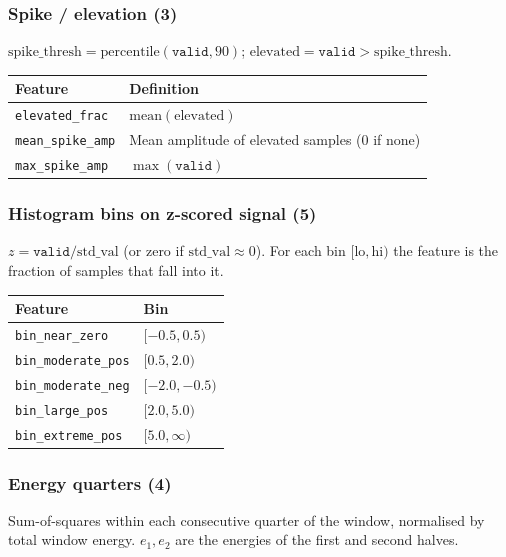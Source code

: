 \documentclass[11pt,a4paper]{article}
\begin{document}
\subsubsection*{Spike / elevation (3)}

$\mathrm{spike\_thresh} = \mathrm{percentile}(\texttt{valid}, 90)$;
$\mathrm{elevated} = \texttt{valid} > \mathrm{spike\_thresh}$.

\begin{tabular}{@{}lp{10cm}@{}}
\toprule
\textbf{Feature} & \textbf{Definition} \\
\midrule
\texttt{elevated\_frac}  & $\mathrm{mean}(\mathrm{elevated})$ \\
\texttt{mean\_spike\_amp}& Mean amplitude of elevated samples (0 if none) \\
\texttt{max\_spike\_amp} & $\max(\texttt{valid})$ \\
\bottomrule
\end{tabular}

\subsubsection*{Histogram bins on z-scored signal (5)}

$z = \texttt{valid} / \mathrm{std\_val}$ (or zero if $\mathrm{std\_val} \approx 0$).
For each bin $[\mathrm{lo}, \mathrm{hi})$ the feature is the fraction of
samples that fall into it.

\begin{tabular}{@{}ll@{}}
\toprule
\textbf{Feature} & \textbf{Bin} \\
\midrule
\texttt{bin\_near\_zero}    & $[-0.5, 0.5)$ \\
\texttt{bin\_moderate\_pos} & $[0.5, 2.0)$  \\
\texttt{bin\_moderate\_neg} & $[-2.0, -0.5)$ \\
\texttt{bin\_large\_pos}    & $[2.0, 5.0)$  \\
\texttt{bin\_extreme\_pos}  & $[5.0, \infty)$ \\
\bottomrule
\end{tabular}

\subsubsection*{Energy quarters (4)}

Sum-of-squares within each consecutive quarter of the window, normalised by
total window energy. $e_1, e_2$ are the energies of the first and second
halves.
\end{document}
